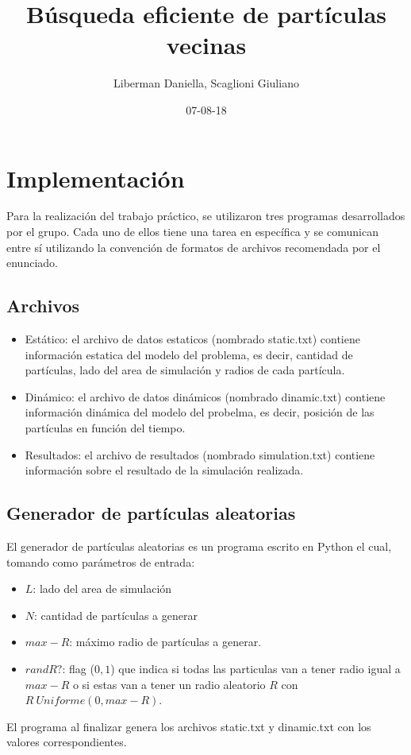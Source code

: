 \documentclass[a4paper]{article}
\title{Búsqueda eficiente de partículas vecinas}
\author{Liberman Daniella, Scaglioni Giuliano}
\date{07-08-18}
\begin{document}
\clearpage\maketitle
\newpage

\setcounter{page}{1}

\tableofcontents
\newpage

\section{Implementación}
Para la realización del trabajo práctico, se utilizaron tres programas desarrollados por el grupo. Cada uno de ellos tiene una tarea en específica y se comunican entre sí utilizando la convención de formatos de archivos recomendada por el enunciado.
\subsection{Archivos}
\begin{itemize}
  \item Estático: el archivo de datos estaticos (nombrado static.txt) contiene información estatica del modelo del problema, es decir, cantidad de partículas, lado del area de simulación y radios de cada partícula.
  \item Dinámico: el archivo de datos dinámicos (nombrado dinamic.txt) contiene información dinámica del modelo del probelma, es decir, posición de las partículas en función del tiempo.
  \item Resultados: el archivo de resultados (nombrado simulation.txt) contiene información sobre el resultado de la simulación realizada.
\end{itemize}
\subsection{Generador de partículas aleatorias}
El generador de partículas aleatorias es un programa escrito en Python el cual, tomando como parámetros de entrada:
\begin{itemize}
  \item $L$: lado del area de simulación
  \item $N$: cantidad de partículas a generar
  \item $max-R$: máximo radio de partículas a generar.
  \item $randR?$: flag (${0,1}$) que indica si todas las particulas van a tener radio igual a $max-R$ o si estas van a tener un radio aleatorio $R$ con $R ~ Uniforme(0,max-R) $.
\end{itemize}
El programa al finalizar genera los archivos static.txt y dinamic.txt con los valores correspondientes.
\end{document}
